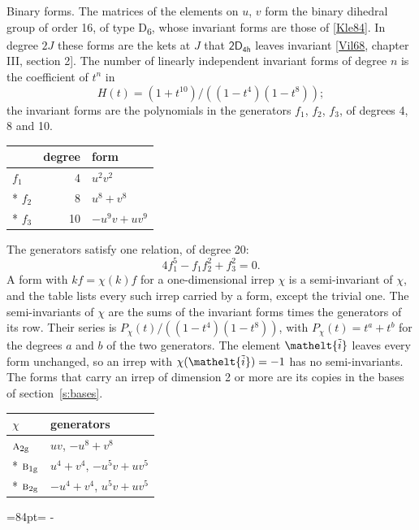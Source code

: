 \documentclass[10pt,a4paper]{article}
\makeatletter
\renewcommand\paragraph{\@startsection{paragraph}{4}{\z@}{1.5ex plus .5ex minus .2ex}{-1em}%
  {\normalfont\small\sffamily\bfseries\color{parttitle}}}
\newcommand{\needspace}[1]{\par\penalty-100\begingroup\dimen0=#1\relax\dimen2=\pagegoal
  \advance\dimen2-\pagetotal\ifdim\dimen0>\dimen2\relax\ifdim\dimen2>0pt\vfil\break\fi\fi
  \endgroup}
\numberwithin{equation}{section}
\newcommand{\eltfont}[1]{{\let\sigma\eltsigma\mathelt{#1}}}
\newcommand{\grp}[1]{\mathsf{#1}}
\newcommand{\irr}[1]{\text{\normalfont\scshape #1}}
\newcommand{\elt}[1]{\eltfont{#1}}
\newcommand{\ptag}[1]{\mathrm{#1}}
\newcommand{\lift}[1]{\tilde{#1}}
\makeatother
\begin{document}
\paragraph{Binary forms.}
The matrices of the elements on $u$, $v$ form the binary dihedral group of order 16, of type D\textsubscript{6}, whose invariant forms are those of [\href{../../../REFERENCES.pdf\#ref.Kle84}{Kle84}]. In degree $2J$ these forms are the kets at $J$ that $\grp{2D_{4h}}$ leaves invariant [\href{../../../REFERENCES.pdf\#ref.Vil68}{Vil68}, chapter III, section 2]. \label{n:head.degree}\label{n:head.form}The number of linearly independent invariant forms of degree $n$ is the coefficient of $t^n$ in
\begin{equation}\label{e:molien}H(t) = (1 + t^{10})/((1-t^{4})(1-t^{8}));\end{equation}
the invariant forms are the polynomials in the generators $f_1$, $f_2$, $f_3$, of degrees 4, 8 and 10.
{\small\begin{longtable}{@{}lrl@{}}\toprule
& degree & form\\\midrule\endhead
\bottomrule\endfoot\endlastfoot
$f_{1}$ & 4 & $u^{2}v^{2}$\\*
$f_{2}$ & 8 & $u^{8} + v^{8}$\\*
$f_{3}$ & 10 & $-u^{9}v + uv^{9}$\\
\bottomrule\end{longtable}}
The generators satisfy one relation, of degree 20:
\begin{equation}\label{e:relation}4f_{1}^{5} - f_{1}f_{2}^{2} + f_{3}^{2} = 0.\end{equation}
A form with $k f = \chi(k) f$ for a one-dimensional irrep $\chi$ is a semi-invariant of $\chi$, and the table lists every such irrep carried by a form, except the trivial one. \label{n:head.generators}The semi-invariants of $\chi$ are the sums of the invariant forms times the generators of its row. Their series is $P_\chi(t)/((1-t^{4})(1-t^{8}))$, with $P_\chi(t) = t^{a} + t^{b}$ for the degrees $a$ and $b$ of the two generators. The element $\elt{\lift{i}}$ leaves every form unchanged, so an irrep with $\chi(\elt{\lift{i}}) = -1$ has no semi-invariants. The forms that carry an irrep of dimension 2 or more are its copies in the bases of section~\ref{s:bases}.
{\small\begin{longtable}{@{}ll@{}}\toprule
$\chi$ & generators\\\midrule\endhead
\bottomrule\endfoot\endlastfoot
$\irr{a}_{2\ptag{g}}$ & $uv$, $-u^{8} + v^{8}$\\*
$\irr{b}_{1\ptag{g}}$ & $u^{4} + v^{4}$, $-u^{5}v + uv^{5}$\\*
$\irr{b}_{2\ptag{g}}$ & $-u^{4} + v^{4}$, $u^{5}v + uv^{5}$\\
\bottomrule\end{longtable}}
\needspace{84pt}
\end{document}
